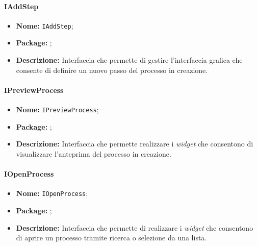 \paragraph{IAddStep}
\begin{itemize}
\item \textbf{Nome:} \texttt{IAddStep};
\item \textbf{Package:} \texttt{\iViewAdmin{}};
\item \textbf{Descrizione:} Interfaccia che permette di gestire l'interfaccia grafica che consente di definire un nuovo passo del processo in creazione.
\end{itemize}

\paragraph{IPreviewProcess}
\begin{itemize}
\item \textbf{Nome:} \texttt{IPreviewProcess};
\item \textbf{Package:} \texttt{\iViewAdmin{}};
\item \textbf{Descrizione:} Interfaccia che permette realizzare i \textit{widget} che consentono di visualizzare l'anteprima del processo in creazione.
\end{itemize}

\paragraph{IOpenProcess}
\begin{itemize}
\item \textbf{Nome:} \texttt{IOpenProcess};
\item \textbf{Package:} \texttt{\iViewAdmin{}};
\item \textbf{Descrizione:} Interfaccia che permette di realizzare i \textit{widget} che consentono di aprire un processo tramite ricerca o selezione da una lista.
\end{itemize}

